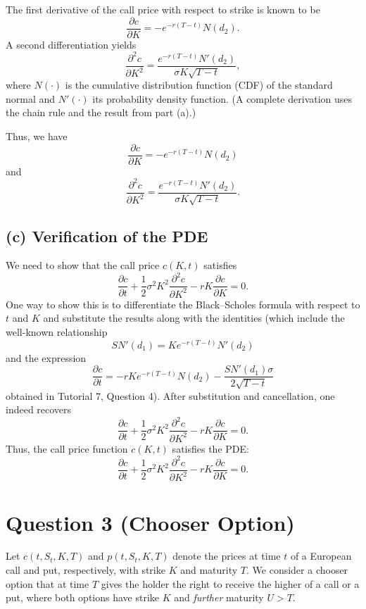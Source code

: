 \documentclass[12pt]{article}
\begin{document}
The first derivative of the call price with respect to strike is known to be
\[
\frac{\partial c}{\partial K} = -e^{-r(T-t)}N(d_2).
\]
A second differentiation yields
\[
\frac{\partial^2 c}{\partial K^2} = \frac{e^{-r(T-t)}N'(d_2)}{\sigma K\sqrt{T-t}},
\]
where \(N(\cdot)\) is the cumulative distribution function (CDF) of the standard normal and \(N'(\cdot)\) its probability density function. (A complete derivation uses the chain rule and the result from part (a).)

Thus, we have
\[
\boxed{\frac{\partial c}{\partial K} = -e^{-r(T-t)}N(d_2)}
\]
and
\[
\boxed{\frac{\partial^2 c}{\partial K^2} = \frac{e^{-r(T-t)}N'(d_2)}{\sigma K\sqrt{T-t}}.}
\]

\subsection*{(c) Verification of the PDE}

We need to show that the call price \(c(K,t)\) satisfies
\[
\frac{\partial c}{\partial t} + \frac{1}{2}\sigma^2K^2\frac{\partial^2 c}{\partial K^2} - rK\frac{\partial c}{\partial K} = 0.
\]
One way to show this is to differentiate the Black--Scholes formula with respect to \(t\) and \(K\) and substitute the results along with the identities (which include the well-known relationship
\[
SN'(d_1) = Ke^{-r(T-t)}N'(d_2)
\]
and the expression
\[
\frac{\partial c}{\partial t} = -rKe^{-r(T-t)}N(d_2) - \frac{SN'(d_1)\sigma}{2\sqrt{T-t}}
\]
obtained in Tutorial 7, Question 4). After substitution and cancellation, one indeed recovers
\[
\frac{\partial c}{\partial t} + \frac{1}{2}\sigma^2K^2\frac{\partial^2 c}{\partial K^2} - rK\frac{\partial c}{\partial K} = 0.
\]
Thus, the call price function \(c(K,t)\) satisfies the PDE:
\[
\boxed{\frac{\partial c}{\partial t} + \frac{1}{2}\sigma^2K^2\frac{\partial^2 c}{\partial K^2} - rK\frac{\partial c}{\partial K} = 0.}
\]

\section*{Question 3 (Chooser Option)}

Let \(c(t,S_t,K,T)\) and \(p(t,S_t,K,T)\) denote the prices at time \(t\) of a European call and put, respectively, with strike \(K\) and maturity \(T\). We consider a chooser option that at time \(T\) gives the holder the right to receive the higher of a call or a put, where both options have strike \(K\) and \emph{further} maturity \(U > T\).
\end{document}
